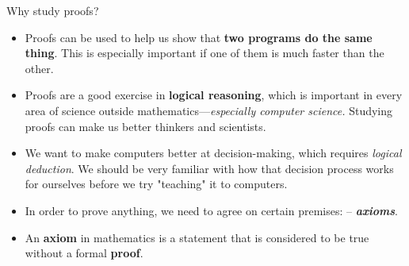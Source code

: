 \documentclass[11pt,aspectratio=1610,handout]{beamer}
\begin{document}

\begin{frame}{Why study proofs?}\p
	\begin{itemize}\itemsep4mm
		\item Proofs can be used to help us show that \textbf{two programs do the same thing}. This is especially important if one of them is much faster than the other. \p
		\item Proofs are a good exercise in \textbf{logical reasoning}, which is important in every area of science outside mathematics---\textit{especially computer science.} Studying proofs can make us better thinkers and scientists. \p
		\item We want to make computers better at decision-making, which requires \emph{logical deduction}. We should be very familiar with how that decision process works for ourselves before we try "teaching" it to computers. \p
		\item In order to prove anything, we need to agree on certain premises:  -- \textbf{\emph{axioms}}.\p
		\item An \textbf{axiom} in mathematics is a statement that is considered to be true without a formal \textbf{proof}. 
	\end{itemize}
\end{frame}
\end{document}
